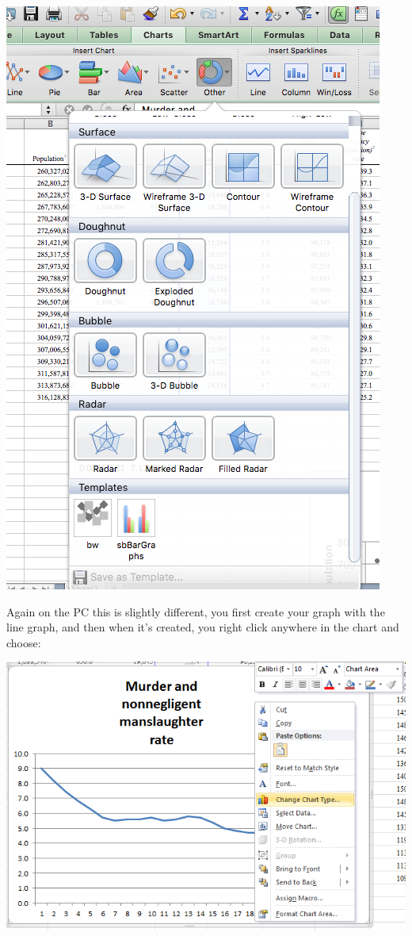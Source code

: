 \documentclass[]{book}
\theoremstyle{definition}
\theoremstyle{definition}
\theoremstyle{definition}
\theoremstyle{remark}
\begin{document}
\includegraphics{imgs/choose_template.png}

Again on the PC this is slightly different, you first create your graph
with the line graph, and then when it's created, you right click
anywhere in the chart and choose:

\includegraphics{imgs/pc_apply_template.png}
\end{document}
